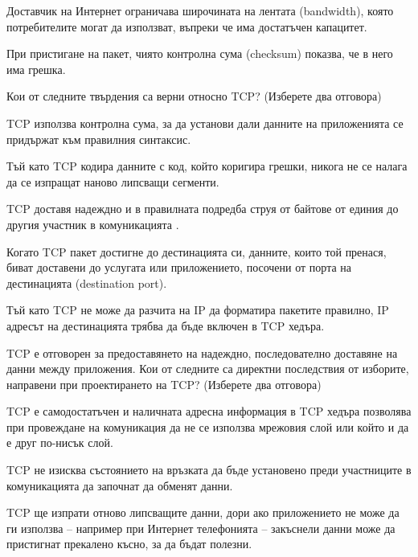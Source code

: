 \begin{questions}
\begin{choices}
    \CorrectChoice Доставчик на Интернет ограничава широчината на лентата
    (\foreignlanguage{english}{bandwidth}), която потребителите могат да
    използват, въпреки че има достатъчен капацитет.

    \choice При пристигане на пакет, чиято контролна сума
    (\foreignlanguage{english}{checksum}) показва, че в него има грешка.
  \end{choices}

  \question[6] Кои от следните твърдения са верни относно
  \foreignlanguage{english}{TCP}? (Изберете два отговора)
  \begin{choices}
    \choice \foreignlanguage{english}{TCP} използва контролна сума, за да
    установи дали данните на приложенията се придържат към правилния синтаксис.

    \choice Тъй като \foreignlanguage{english}{TCP} кодира данните с код, който
    коригира грешки, никога не се налага да се изпращат наново липсващи
    сегменти.

    \CorrectChoice \foreignlanguage{english}{TCP} доставя надеждно и в
    правилната подредба струя от байтове от единия до другия участник в
    комуникацията .

    \CorrectChoice Когато \foreignlanguage{english}{TCP} пакет достигне до
    дестинацията си, данните, които той пренася, биват доставени до услугата или
    приложението, посочени от порта на дестинацията
    (\foreignlanguage{english}{destination port}).

    \choice Тъй като \foreignlanguage{english}{TCP} не може да разчита на
    IP да форматира пакетите правилно, IP адресът на дестинацията трябва да бъде
    включен в TCP хедъра.
  \end{choices}

  \question[6] TCP е отговорен за предоставянето на надеждно, последователно
  доставяне на данни между приложения. Кои от следните са директни последствия
  от изборите, направени при проектирането на TCP? (Изберете два отговора)
  \begin{choices}
    \choice TCP е самодостатъчен и наличната адресна информация в TCP хедъра
    позволява при провеждане на комуникация да не се използва мрежовия слой или
    който и да е друг по-нисък слой.

    \choice TCP не изисква състоянието на връзката да бъде установено преди
    участниците в комуникацията да започнат да обменят данни.

    \CorrectChoice TCP ще изпрати отново липсващите данни, дори ако приложението
    не може да ги използва -- например при Интернет телефонията -- закъснели
    данни може да пристигнат прекалено късно, за да бъдат полезни.


\end{choices}
\end{questions}
